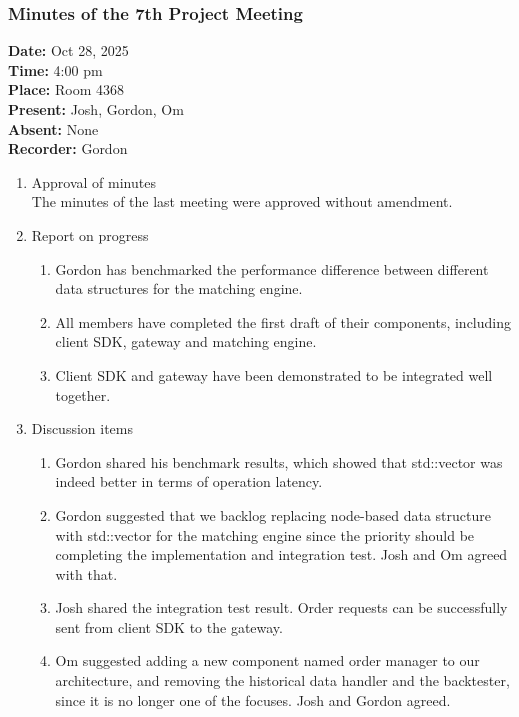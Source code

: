 \documentclass[12pt,a4paper]{article}
\begin{document}
\subsubsection{Minutes of the 7th Project Meeting}
\textbf{Date:} Oct 28, 2025\\
\textbf{Time:} 4:00 pm\\
\textbf{Place:} Room 4368\\
\textbf{Present:} Josh, Gordon, Om\\
\textbf{Absent:} None\\
\textbf{Recorder:} Gordon

\begin{enumerate}
\item Approval of minutes\\
The minutes of the last meeting were approved without amendment.\\
\item Report on progress
\begin{enumerate}
\item Gordon has benchmarked the performance difference between different data structures for the matching engine.\\
\item All members have completed the first draft of their components, including client SDK, gateway and matching engine.\\
\item Client SDK and gateway have been demonstrated to be integrated well together.\\
\end{enumerate}
\item Discussion items
\begin{enumerate}
\item Gordon shared his benchmark results, which showed that std::vector was indeed better in terms of operation latency.\\
\item Gordon suggested that we backlog replacing node-based data structure with std::vector for the matching engine since the priority should be completing the implementation and integration test. Josh and Om agreed with that.\\
\item Josh shared the integration test result. Order requests can be successfully sent from client SDK to the gateway.\\
\item Om suggested adding a new component named order manager to our architecture, and removing the historical data handler and the backtester, since it is no longer one of the focuses. Josh and Gordon agreed.\\

\end{enumerate}
\end{enumerate}
\end{document}
